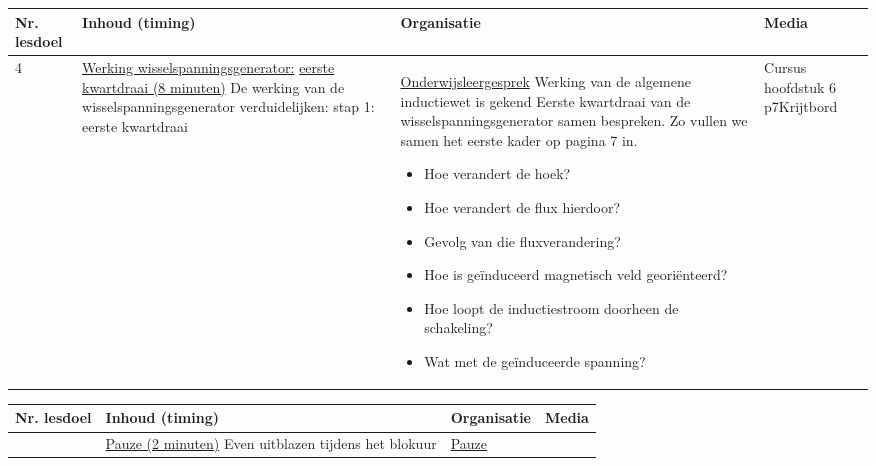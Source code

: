 \begin{landscape}
\begin{tabularx}{1.56\textwidth}{|p{1.5cm}|p{6.5cm}|X|p{4cm}|}
	\hline
	\textbf{Nr. lesdoel } & \textbf{Inhoud (timing)}  & \textbf{Organisatie } & \textbf{Media } \\ \hline
	4& \underline{Werking wisselspanningsgenerator:} \underline{eerste kwartdraai (8 minuten)}\newline
	De werking van de wisselspanningsgenerator verduidelijken: stap 1: eerste kwartdraai
	&  \underline{Onderwijsleergesprek}\newline  
	Werking van de algemene inductiewet is gekend\newline
	Eerste kwartdraai van de wisselspanningsgenerator samen bespreken. Zo vullen we samen het eerste kader op pagina 7 in.\newline
	\begin{itemize}
		\item Hoe verandert de hoek?
		\item Hoe verandert de flux hierdoor?
		\item Gevolg van die fluxverandering?
		\item Hoe is geïnduceerd magnetisch veld georiënteerd?
		\item Hoe loopt de inductiestroom doorheen de schakeling?
		\item Wat met de geïnduceerde spanning?
	\end{itemize}
	&  Cursus hoofdstuk 6 p7\newline\newline Krijtbord
	\\ \hline
\end{tabularx}\vspace{5mm}


\begin{tabularx}{1.56\textwidth}{|p{1.5cm}|p{6.5cm}|X|p{3cm}|}
	\hline
	\textbf{Nr. lesdoel } & \textbf{Inhoud (timing)}  & \textbf{Organisatie } & \textbf{Media } \\ \hline
	& \underline{Pauze (2 minuten)}\newline
	Even uitblazen tijdens het blokuur
	&  \underline{Pauze}\newline 
	&  
	\\ \hline
\end{tabularx}\vspace{5mm}



\end{landscape}
